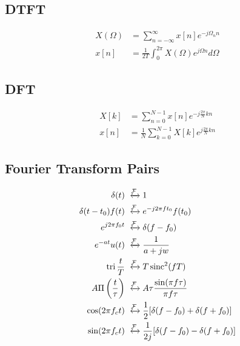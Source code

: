\subsection{DTFT}
\begin{align*}
    X(\Omega) &= \sum_{n=-\infty}^\infty x[n] e^{-j\Omega_n n}\\
    x[n] &= \frac{1}{2T}\int_0^{2\pi}X(\Omega)e^{j\Omega n}d\Omega
\end{align*}
\subsection{DFT}
\begin{align*}
    X[k] &= \sum_{n=0}^{N-1}x[n]e^{-j\frac{2\pi}{N}kn}\\
    x[n] &= \frac{1}{N}\sum_{k=0}^{N-1}X[k]e^{j\frac{2\pi}{N}kn}
\end{align*}
\subsection{Fourier Transform Pairs}
\begin{align*}
    \delta(t) &\xleftrightarrow{\mathcal{F}} 1\\
    \delta(t-t_0)f(t) &\xleftrightarrow{\mathcal{F}} e^{-j2\pi ft_0}f(t_0)\\
    e^{j2\pi f_0t} &\xleftrightarrow{\mathcal{F}} \delta(f-f_0)\\
    e^{-at}u(t) &\xleftrightarrow{\mathcal{F}} \frac{1}{a + jw}\\
    \tri \frac{t}{T} &\xleftrightarrow{\mathcal{F}} T\sinc^2 (fT)\\
    A\Pi\left( \frac{t}{\tau} \right) &\xleftrightarrow{\mathcal{F}} A\tau\frac{\sin (\pi f\tau)}{\pi f\tau}\\
    \cos (2\pi f_c t) &\xleftrightarrow{\mathcal{F}} \frac{1}{2}[\delta(f-f_0) + \delta(f + f_0)]\\
    \sin (2\pi f_c t) &\xleftrightarrow{\mathcal{F}} \frac{1}{2j}[\delta(f-f_0) - \delta(f + f_0)]
\end{align*}
